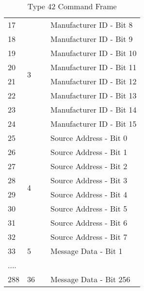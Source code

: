 \documentclass[]{article}
\begin{document}
\begin{table}[ht]
\begin{tabular}{llll}
		17           & \multirow{8}{*}{3} & \multirow{8}{*}{} & Manufacturer ID - Bit 8       \\
		18           &                    &                   & Manufacturer ID - Bit 9       \\
		19           &                    &                   & Manufacturer ID - Bit 10      \\
		20           &                    &                   & Manufacturer ID - Bit 11      \\
		21           &                    &                   & Manufacturer ID - Bit 12      \\
		22           &                    &                   & Manufacturer ID - Bit 13      \\
		23           &                    &                   & Manufacturer ID - Bit 14      \\
		24           &                    &                   & Manufacturer ID - Bit 15      \\ \hline
		25           & \multirow{8}{*}{4} & \multirow{8}{*}{} & Source Address - Bit 0        \\
		26           &                    &                   & Source Address - Bit 1        \\
		27           &                    &                   & Source Address - Bit 2        \\
		28           &                    &                   & Source Address - Bit 3        \\
		29           &                    &                   & Source Address - Bit 4        \\
		30           &                    &                   & Source Address - Bit 5        \\
		31           &                    &                   & Source Address - Bit 6        \\
		32           &                    &                   & Source Address - Bit 7        \\ \hline
		33           & 5                  &                   & Message Data - Bit 1          \\
		\multicolumn{4}{l}{....}                                                              \\
		288          & 36                 &                   & Message Data - Bit 256        \\ \hline
	\end{tabular}
	\caption{Type 42 Command Frame}
	\label{tab:type-42-frame}
\end{table}
\end{document}
